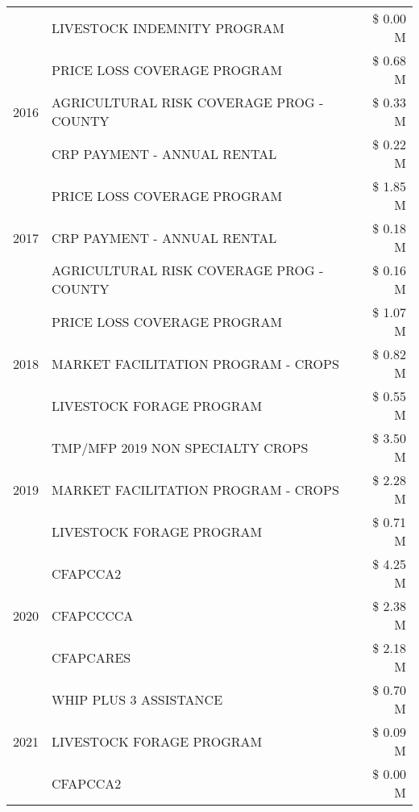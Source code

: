 \begin{tabular}{llr}
 & LIVESTOCK INDEMNITY PROGRAM & \$ 0.00 M \\
\cline{1-3}
\multirow[t]{3}{*}{2016} & PRICE LOSS COVERAGE PROGRAM & \$ 0.68 M \\
 & AGRICULTURAL RISK COVERAGE PROG - COUNTY & \$ 0.33 M \\
 & CRP PAYMENT - ANNUAL RENTAL & \$ 0.22 M \\
\cline{1-3}
\multirow[t]{3}{*}{2017} & PRICE LOSS COVERAGE PROGRAM & \$ 1.85 M \\
 & CRP PAYMENT - ANNUAL RENTAL & \$ 0.18 M \\
 & AGRICULTURAL RISK COVERAGE PROG - COUNTY & \$ 0.16 M \\
\cline{1-3}
\multirow[t]{3}{*}{2018} & PRICE LOSS COVERAGE PROGRAM & \$ 1.07 M \\
 & MARKET FACILITATION PROGRAM - CROPS & \$ 0.82 M \\
 & LIVESTOCK FORAGE PROGRAM & \$ 0.55 M \\
\cline{1-3}
\multirow[t]{3}{*}{2019} & TMP/MFP 2019 NON SPECIALTY CROPS & \$ 3.50 M \\
 & MARKET FACILITATION PROGRAM - CROPS & \$ 2.28 M \\
 & LIVESTOCK FORAGE PROGRAM & \$ 0.71 M \\
\cline{1-3}
\multirow[t]{3}{*}{2020} & CFAPCCA2 & \$ 4.25 M \\
 & CFAPCCCCA & \$ 2.38 M \\
 & CFAPCARES & \$ 2.18 M \\
\cline{1-3}
\multirow[t]{3}{*}{2021} & WHIP PLUS 3 ASSISTANCE & \$ 0.70 M \\
 & LIVESTOCK FORAGE PROGRAM & \$ 0.09 M \\
 & CFAPCCA2 & \$ 0.00 M \\
\cline{1-3}
\bottomrule
\end{tabular}
